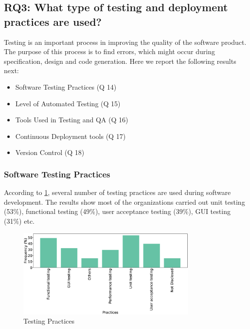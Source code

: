 \subsection{RQ3: What type of testing and deployment practices are used?}
\label{RQ3}
Testing is an important process in improving the quality of the software product. The purpose of this process is to find errors, which might occur during specification, design and code generation. Here we report the following results next:
\begin{itemize}
\item Software Testing Practices (Q 14)
\item Level of Automated Testing (Q 15)
\item Tools Used in Testing and QA (Q 16)
\item Continuous Deployment tools (Q 17)
\item Version Control (Q 18)
\end{itemize}

\subsubsection{Software Testing Practices}
According to \cref{fig:testing}, several number of testing practices are used during software development. The results show most of the organizations carried out unit testing (53\%), functional testing (49\%), user acceptance testing (39\%), GUI testing (31\%) etc.
\begin{figure}[htbp]
\centering
  \includegraphics[width=0.8\textwidth]{Figures/Respondents_testing_practices}
  \caption{Testing Practices}
  \label{fig:testing}
\end{figure}

